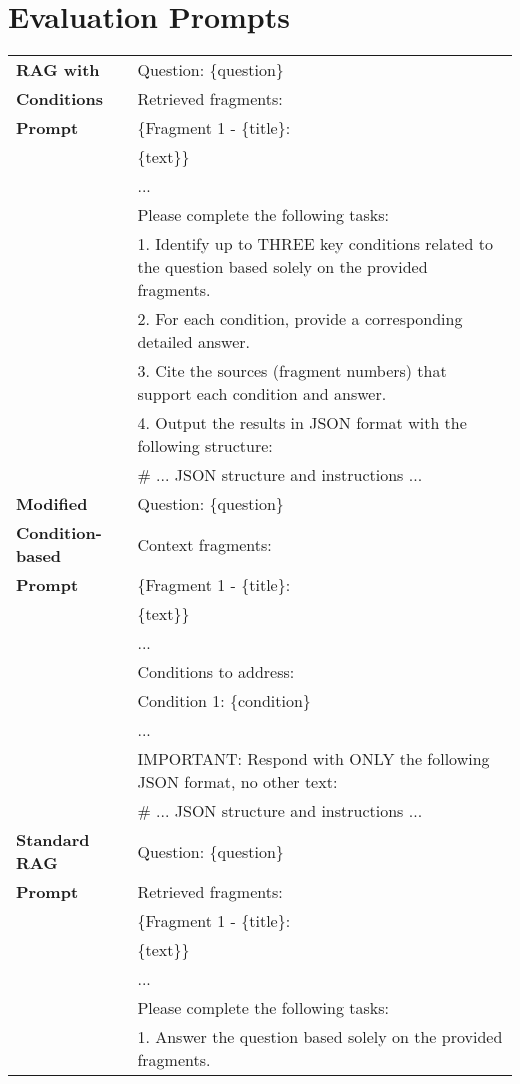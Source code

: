 \section{Evaluation Prompts}
\label{appendix_labeld}
\begin{tabular}{l p{}}
\hline
\textbf{RAG with} & Question: \{question\} \\
\textbf{Conditions} & Retrieved fragments: \\
\textbf{Prompt} & \{Fragment 1 - \{title\}: \\
& \{text\}\} \\
& ... \\
& Please complete the following tasks: \\
& 1. Identify up to THREE key conditions related to the question based solely on the provided fragments. \\
& 2. For each condition, provide a corresponding detailed answer. \\
& 3. Cite the sources (fragment numbers) that support each condition and answer. \\
& 4. Output the results in JSON format with the following structure: \\
& \# ... JSON structure and instructions ... \\
\hline
\textbf{Modified} & Question: \{question\} \\
\textbf{Condition-based} & Context fragments: \\
\textbf{Prompt} & \{Fragment 1 - \{title\}: \\
& \{text\}\} \\
& ... \\
& Conditions to address: \\
& Condition 1: \{condition\} \\
& ... \\
& IMPORTANT: Respond with ONLY the following JSON format, no other text: \\
& \# ... JSON structure and instructions ... \\
\hline
\textbf{Standard RAG} & Question: \{question\} \\
\textbf{Prompt} & Retrieved fragments: \\
& \{Fragment 1 - \{title\}: \\
& \{text\}\} \\
& ... \\
& Please complete the following tasks: \\
& 1. Answer the question based solely on the provided fragments. \\

\end{tabular}
